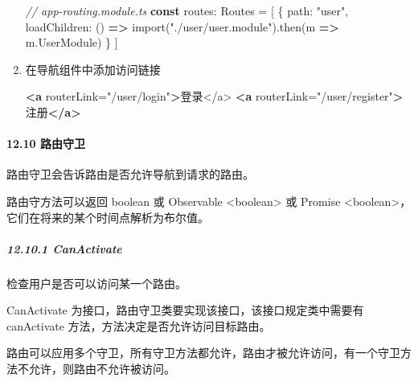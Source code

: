 \documentclass[
]{article}
\newenvironment{Shaded}{}{}
\newcommand{\AttributeTok}[1]{\textcolor[rgb]{0.49,0.56,0.16}{#1}}
\newcommand{\CommentTok}[1]{\textcolor[rgb]{0.38,0.63,0.69}{\textit{#1}}}
\newcommand{\DataTypeTok}[1]{\textcolor[rgb]{0.56,0.13,0.00}{#1}}
\newcommand{\FunctionTok}[1]{\textcolor[rgb]{0.02,0.16,0.49}{#1}}
\newcommand{\ImportTok}[1]{#1}
\newcommand{\KeywordTok}[1]{\textcolor[rgb]{0.00,0.44,0.13}{\textbf{#1}}}
\newcommand{\NormalTok}[1]{#1}
\newcommand{\OperatorTok}[1]{\textcolor[rgb]{0.40,0.40,0.40}{#1}}
\newcommand{\OtherTok}[1]{\textcolor[rgb]{0.00,0.44,0.13}{#1}}
\newcommand{\StringTok}[1]{\textcolor[rgb]{0.25,0.44,0.63}{#1}}
\begin{document}
\begin{enumerate}
\begin{Shaded}
\begin{Highlighting}[]
\CommentTok{// app{-}routing.module.ts}
\KeywordTok{const}\NormalTok{ routes}\OperatorTok{:}\NormalTok{ Routes }\OperatorTok{=}\NormalTok{ [}
\NormalTok{  \{}
    \DataTypeTok{path}\OperatorTok{:} \StringTok{"user"}\OperatorTok{,}
    \DataTypeTok{loadChildren}\OperatorTok{:}\NormalTok{ () }\KeywordTok{=\textgreater{}} \ImportTok{import}\NormalTok{(}\StringTok{"./user/user.module"}\NormalTok{)}\OperatorTok{.}\FunctionTok{then}\NormalTok{(m }\KeywordTok{=\textgreater{}}\NormalTok{ m}\OperatorTok{.}\AttributeTok{UserModule}\NormalTok{)}
\NormalTok{  \}}
\NormalTok{]}
\end{Highlighting}
\end{Shaded}
\item
  在导航组件中添加访问链接

\begin{Shaded}
\begin{Highlighting}[]
\KeywordTok{\textless{}a}\OtherTok{ routerLink=}\StringTok{"/user/login"}\KeywordTok{\textgreater{}}\NormalTok{登录\textless{}/a\textgreater{}}
\KeywordTok{\textless{}a}\OtherTok{ routerLink=}\StringTok{"/user/register"}\KeywordTok{\textgreater{}}\NormalTok{注册}\KeywordTok{\textless{}/a\textgreater{}}
\end{Highlighting}
\end{Shaded}
\end{enumerate}

\hypertarget{1210-ux8defux7531ux5b88ux536b}{%
\paragraph{12.10 路由守卫}\label{1210-ux8defux7531ux5b88ux536b}}

路由守卫会告诉路由是否允许导航到请求的路由。

路由守方法可以返回 boolean 或 Observable
\textless{}boolean\textgreater{} 或 Promise
\textless{}boolean\textgreater{}，它们在将来的某个时间点解析为布尔值。

\hypertarget{12101-canactivate}{%
\subparagraph{12.10.1 CanActivate}\label{12101-canactivate}}

检查用户是否可以访问某一个路由。

CanActivate 为接口，路由守卫类要实现该接口，该接口规定类中需要有
canActivate 方法，方法决定是否允许访问目标路由。

路由可以应用多个守卫，所有守卫方法都允许，路由才被允许访问，有一个守卫方法不允许，则路由不允许被访问。
\end{document}
